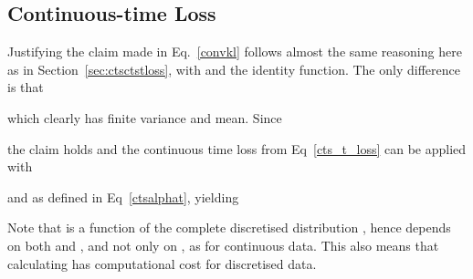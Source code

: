 \documentclass[11pt,table]{article}
\newcommand{\0}[1]{\constvec{0}{#1}}
\newcommand{\1}[1]{\constvec{1}{#1}}
\begin{document}
\subsection{Continuous-time Loss \texorpdfstring{}{}}
Justifying the claim made in Eq.~\ref{convkl} follows almost the same reasoning here as in Section~\ref{sec:ctsctstloss}, with  and  the identity function. 
The only difference is that

which clearly has finite variance and mean.
Since

the claim holds and the continuous time loss from Eq~\ref{cts_t_loss} can be applied with

and  as defined in Eq~\ref{ctsalphat}, yielding

Note that  is a function of the complete discretised distribution , hence  depends on both  and , and not only on , as for continuous data. This also means that calculating  has  computational cost for discretised data.
\end{document}
